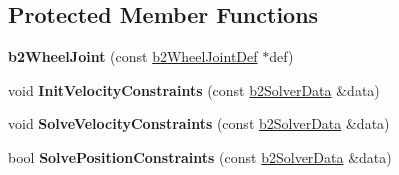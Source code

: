 \subsection*{Protected Member Functions}
\begin{DoxyCompactItemize}
\item 
{\bfseries b2\+Wheel\+Joint} (const \hyperlink{structb2_wheel_joint_def}{b2\+Wheel\+Joint\+Def} $\ast$def)\hypertarget{classb2_wheel_joint_a9c8bbb1068ddb46d074fe91802dd6a39}{}\label{classb2_wheel_joint_a9c8bbb1068ddb46d074fe91802dd6a39}

\item 
void {\bfseries Init\+Velocity\+Constraints} (const \hyperlink{structb2_solver_data}{b2\+Solver\+Data} \&data)\hypertarget{classb2_wheel_joint_af3fc35c89dc253661297d69fe4a00a97}{}\label{classb2_wheel_joint_af3fc35c89dc253661297d69fe4a00a97}

\item 
void {\bfseries Solve\+Velocity\+Constraints} (const \hyperlink{structb2_solver_data}{b2\+Solver\+Data} \&data)\hypertarget{classb2_wheel_joint_a09283ebe01298e6a2e897ca409b70289}{}\label{classb2_wheel_joint_a09283ebe01298e6a2e897ca409b70289}

\item 
bool {\bfseries Solve\+Position\+Constraints} (const \hyperlink{structb2_solver_data}{b2\+Solver\+Data} \&data)\hypertarget{classb2_wheel_joint_ae14faaa2cd91bdea615e86c0dd2ccc97}{}\label{classb2_wheel_joint_ae14faaa2cd91bdea615e86c0dd2ccc97}

\end{DoxyCompactItemize}
